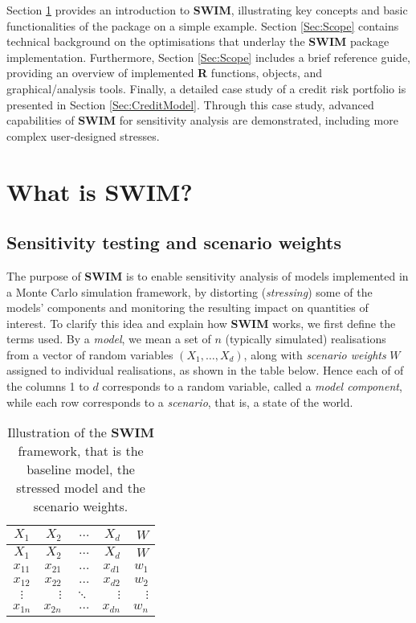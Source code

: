 \documentclass[
]{article}
\begin{document}
Section \ref{Sec:Intro} provides an introduction to \textbf{SWIM}, illustrating key concepts and basic functionalities of the package on a simple example. Section
\ref{Sec:Scope} contains technical background on the optimisations that underlay the \textbf{SWIM} package implementation. Furthermore, Section \ref{Sec:Scope} includes a brief reference guide, providing an overview of implemented \textbf{R} functions, objects, and graphical/analysis tools. Finally, a detailed case study of a credit risk portfolio is presented in Section \ref{Sec:CreditModel}. Through this case study, advanced capabilities of \textbf{SWIM} for sensitivity analysis are demonstrated, including more complex user-designed stresses.

\hypertarget{Sec:Intro}{%
\section{\texorpdfstring{What is \textbf{SWIM}?}{What is SWIM?}}\label{Sec:Intro}}

\hypertarget{sensitivity-testing-and-scenario-weights}{%
\subsection{Sensitivity testing and scenario weights}\label{sensitivity-testing-and-scenario-weights}}

The purpose of \textbf{SWIM} is to enable sensitivity analysis of models implemented in a Monte Carlo simulation framework, by distorting (\emph{stressing}) some of the models' components and monitoring the resulting impact on quantities of interest.
To clarify this idea and explain how \textbf{SWIM} works, we first define the terms used. By a \emph{model}, we mean a set of \(n\) (typically simulated) realisations from a vector of random variables \((X_1,\dots,X_d)\), along with \emph{scenario weights} \(W\) assigned to individual realisations, as shown in the table below. Hence each of of the columns 1 to \(d\) corresponds to a random variable, called a \emph{model component}, while each row corresponds to a \emph{scenario}, that is, a state of the world.

\begin{longtable}[]{@{}crrrr@{}}
\caption{\label{tab:SWIMframework} Illustration of the \textbf{SWIM} framework, that is the baseline model, the stressed model and the scenario weights.}\tabularnewline
\toprule
\(X_1\) & \(X_2\) & \(\dots\) & \(X_d\) & \(W\)\tabularnewline
\midrule
\endfirsthead
\toprule
\(X_1\) & \(X_2\) & \(\dots\) & \(X_d\) & \(W\)\tabularnewline
\midrule
\endhead
\(x_{11}\) & \(x_{21}\) & \(\dots\) & \(x_{d1}\) & \(w_1\)\tabularnewline
\(x_{12}\) & \(x_{22}\) & \(\dots\) & \(x_{d2}\) & \(w_2\)\tabularnewline
\(\vdots\) & \(\vdots\) & \(\ddots\) & \(\vdots\) & \(\vdots\)\tabularnewline
\(x_{1n}\) & \(x_{2n}\) & \(\dots\) & \(x_{dn}\) & \(w_n\)\tabularnewline
\bottomrule
\end{longtable}
\end{document}
